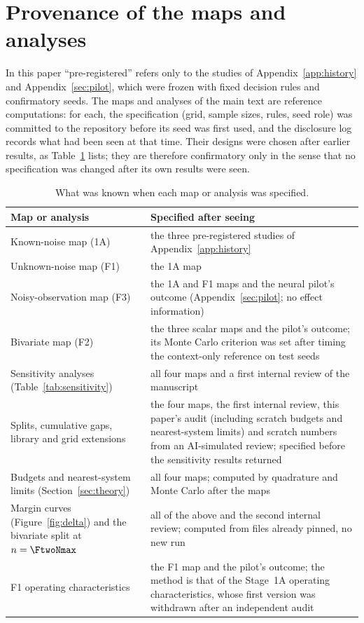 \section{Provenance of the maps and analyses}\label{app:provenance}
In this paper ``pre-registered'' refers only to the studies of Appendix~\ref{app:history} and Appendix~\ref{sec:pilot}, which
were frozen with fixed decision rules and confirmatory seeds. The maps and analyses of the main text are reference computations:
for each, the specification (grid, sample sizes, rules, seed role) was committed to the repository before its seed was first
used, and the disclosure log records what had been seen at that time. Their designs were chosen after earlier results, as
Table~\ref{tab:provenance} lists; they are therefore confirmatory only in the sense that no specification was changed after
its own results were seen.

\begin{table}[h]
\centering\small
\caption{What was known when each map or analysis was specified.}\label{tab:provenance}
\begin{tabular}{>{\raggedright\arraybackslash}p{10em}>{\raggedright\arraybackslash}p{\dimexpr\linewidth-10em-4\tabcolsep\relax}}
\toprule
Map or analysis & Specified after seeing \\
\midrule
Known-noise map (1A) & the three pre-registered studies of Appendix~\ref{app:history} \\
Unknown-noise map (F1) & the 1A map \\
Noisy-observation map (F3) & the 1A and F1 maps and the neural pilot's outcome (Appendix~\ref{sec:pilot}; no effect
information) \\
Bivariate map (F2) & the three scalar maps and the pilot's outcome; its Monte Carlo criterion was set after timing the
context-only reference on test seeds \\
Sensitivity analyses (Table~\ref{tab:sensitivity}) & all four maps and a first internal review of the manuscript \\
Splits, cumulative gaps, library and grid extensions & the four maps, the first internal review, this paper's audit
(including scratch budgets and nearest-system limits) and scratch numbers from an AI-simulated review; specified before the
sensitivity results returned \\
Budgets and nearest-system limits (Section~\ref{sec:theory}) & all four maps; computed by quadrature and Monte Carlo after
the maps \\
Margin curves (Figure~\ref{fig:delta}) and the bivariate split at $n=\FtwoNmax$ & all of the above and the second internal
review; computed from files already pinned, no new run \\
F1 operating characteristics & the F1 map and the pilot's outcome; the method is that of the Stage~1A operating characteristics, whose first
version was withdrawn after an independent audit \\
\bottomrule
\end{tabular}
\end{table}
